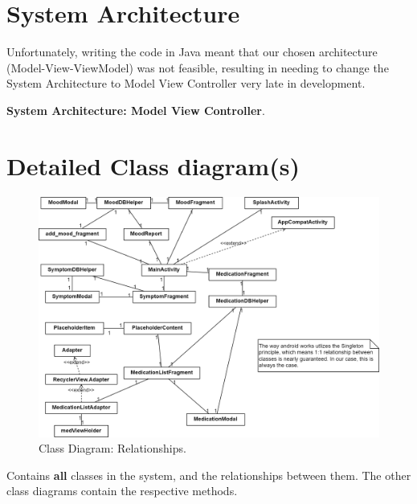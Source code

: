 \documentclass[11pt]{article}
\begin{document}
    \pagebreak


    \section{System Architecture}\label{sec:system-architecture}

    Unfortunately, writing the code in Java meant that our chosen architecture (Model-View-ViewModel) was not feasible, resulting in needing to change the System Architecture to Model View Controller very late in development.

    \textbf{System Architecture: Model View Controller}.

    \pagebreak


    \section{Detailed Class diagram(s)}\label{sec:detailed-class-diagram(s)}

    \begin{figure}[H]
        \centering
        \includegraphics[width=\textwidth]{Diagrams/Class Diagrams/Class Diagram-Class Relationships (No Method)}
        \caption{Class Diagram: Relationships.}
        \label{fig:figure}
    \end{figure}

    Contains \textbf{all} classes in the system, and the relationships between them.
    The other class diagrams contain the respective methods.
\end{document}
